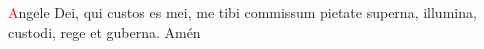 \textcolor{red}{A}ngele Dei, qui custos es mei, me tibi commissum pietate superna, illumina, custodi, rege et guberna. Amén